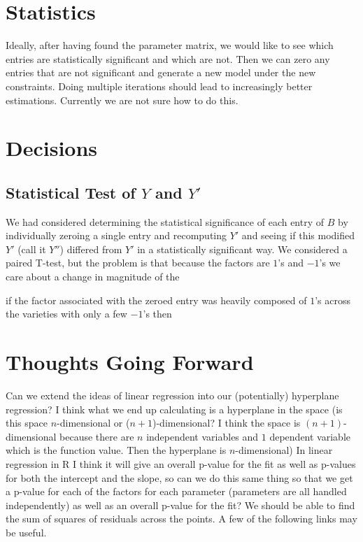 \documentclass[12pt]{amsart}
\theoremstyle{plain}
\theoremstyle{definition}
\begin{document}
\section{Statistics}

Ideally, after having found the parameter matrix, we would like to see which entries are statistically significant and which are not. Then we can zero any entries that are not significant and generate a new model under the new constraints. Doing multiple iterations should lead to increasingly better estimations. Currently we are not sure how to do this. 

\section{Decisions}

\subsection{Statistical Test of $Y$ and $Y'$}

We had considered determining the statistical significance of each entry of $B$ by individually zeroing a single entry and recomputing $Y'$ and seeing if this modified $Y'$ (call it $Y''$) differed from $Y'$ in a statistically significant way. We considered a paired T-test, but the problem is that because the factors are $1$'s and $-1$'s we care about a change in magnitude of the 

if the factor associated with the zeroed entry was heavily composed of $1$'s across the varieties with only a few $-1$'s then 

\section{Thoughts Going Forward}

Can we extend the ideas of linear regression into our (potentially) hyperplane regression? I think what we end up calculating is a hyperplane in the space (is this space $n$-dimensional or ($n+1$)-dimensional? I think the space is $(n+1)$-dimensional because there are $n$ independent variables and $1$ dependent variable which is the function value. Then the hyperplane is $n$-dimensional) In linear regression in R I think it will give an overall p-value for the fit as well as p-values for both the intercept and the slope, so can we do this same thing so that we get a p-value for each of the factors for each parameter (parameters are all handled independently) as well as an overall p-value for the fit? We should be able to find the sum of squares of residuals across the points. A few of the following links may be useful.
\end{document}
